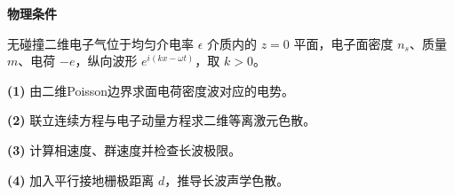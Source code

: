 \textbf{物理条件}\par 无碰撞二维电子气位于均匀介电率 \(\epsilon\) 介质内的 \(z=0\) 平面，电子面密度 \(n_s\)、质量 \(m\)、电荷 \(-e\)，纵向波形 \(e^{i(kx-\omega t)}\)，取 \(k>0\)。
\par\noindent\textbf{(1)} 由二维Poisson边界求面电荷密度波对应的电势。
\par\noindent\textbf{(2)} 联立连续方程与电子动量方程求二维等离激元色散。
\par\noindent\textbf{(3)} 计算相速度、群速度并检查长波极限。
\par\noindent\textbf{(4)} 加入平行接地栅极距离 \(d\)，推导长波声学色散。
